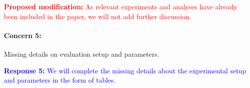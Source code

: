\documentclass[12pt,one-column]{article}
\begin{document}
\noindent\textcolor{red}{\textbf{Proposed modification: }
As relevant experiments and analyses have already been included in the paper, we will not add further discussion.
}






{\it \paragraph{Concern 5:}Missing details on evaluation setup and parameters.}


\noindent\textcolor{blue}{\textbf{Response 5:}
We will complete the missing details about the experimental setup and parameters in the form of tables.
}
\end{document}
